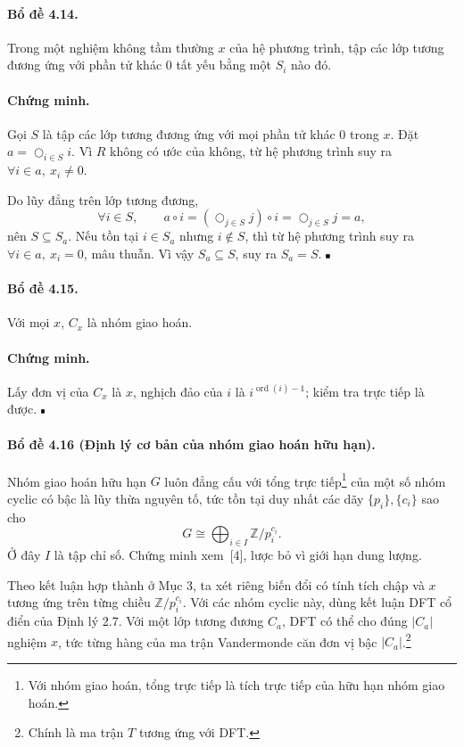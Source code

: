\documentclass[11pt]{article}
\newcommand{\qedmark}{\hfill\rule{0.7ex}{0.7ex}}
\begin{document}
\paragraph{Bổ đề 4.14.}
Trong một nghiệm không tầm thường \(x\) của hệ phương trình, tập các lớp tương
đương ứng với phần tử khác \(0\) tất yếu bằng một \(S_i\) nào đó.

\paragraph{Chứng minh.}
Gọi \(S\) là tập các lớp tương đương ứng với mọi phần tử khác \(0\) trong \(x\).
Đặt \(a=\bigcirc_{i\in S}i\). Vì \(R\) không có ước của không, từ hệ phương
trình suy ra \(\forall i\in a,\ x_i\ne0\).

Do lũy đẳng trên lớp tương đương,
\[
  \forall i\in S,\qquad
  a\circ i=\left(\bigcirc_{j\in S}j\right)\circ i=\bigcirc_{j\in S}j=a,
\]
nên \(S\subseteq S_a\). Nếu tồn tại \(i\in S_a\) nhưng \(i\notin S\), thì từ hệ
phương trình suy ra \(\forall i\in a,\ x_i=0\), mâu thuẫn. Vì vậy
\(S_a\subseteq S\), suy ra \(S_a=S\). \(\qedmark\)

\paragraph{Bổ đề 4.15.}
Với mọi \(x\), \(C_x\) là nhóm giao hoán.

\paragraph{Chứng minh.}
Lấy đơn vị của \(C_x\) là \(x\), nghịch đảo của \(i\) là
\(i^{\operatorname{ord}(i)-1}\); kiểm tra trực tiếp là được. \(\qedmark\)

\paragraph{Bổ đề 4.16 (Định lý cơ bản của nhóm giao hoán hữu hạn).}
Nhóm giao hoán hữu hạn \(G\) luôn đẳng cấu với tổng trực tiếp\footnote{Với nhóm
giao hoán, tổng trực tiếp là tích trực tiếp của hữu hạn nhóm giao hoán.} của một
số nhóm cyclic có bậc là lũy thừa nguyên tố, tức tồn tại duy nhất các dãy
\(\{p_i\},\{c_i\}\) sao cho
\[
  G\cong\bigoplus_{i\in I}\mathbb Z/p_i^{c_i}.
\]
Ở đây \(I\) là tập chỉ số. Chứng minh xem~[4], lược bỏ vì giới hạn dung lượng.

Theo kết luận hợp thành ở Mục 3, ta xét riêng biến đổi có tính tích chập và
\(x\) tương ứng trên từng chiều \(\mathbb Z/p_i^{c_i}\). Với các nhóm cyclic
này, dùng kết luận DFT cổ điển của Định lý 2.7. Với một lớp tương đương \(C_a\),
DFT có thể cho đúng \(|C_a|\) nghiệm \(x\), tức từng hàng của ma trận
Vandermonde căn đơn vị bậc \(|C_a|\).\footnote{Chính là ma trận \(T\) tương ứng
với DFT.}
\end{document}
